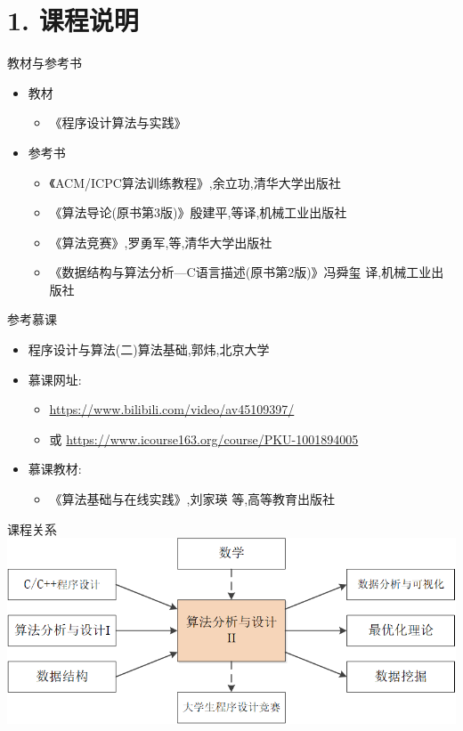 


\frame{\titlepage}
\section{1. 课程说明}
\begin{frame}{教材与参考书}
    \begin{itemize}
        \item 教材
        \begin{itemize}
            \item《程序设计算法与实践》
        \end{itemize}
        \vfill
        \item 参考书
        \begin{itemize}
            \item 《ACM/ICPC算法训练教程》,余立功,清华大学出版社
            \item 《算法导论(原书第3版)》殷建平,等译,机械工业出版社
            \item 《算法竞赛》,罗勇军,等,清华大学出版社
            \item 《数据结构与算法分析—C语言描述(原书第2版)》冯舜玺 译,机械工业出版社
        \end{itemize}
    \end{itemize}
\end{frame}
\begin{frame}{参考慕课}
    \begin{itemize}
        \item 程序设计与算法(二)算法基础,郭炜,北京大学
        \vfill
        \item 慕课网址:
        \begin{itemize}
            \item \url{https://www.bilibili.com/video/av45109397/}
            \item 或 \url{https://www.icourse163.org/course/PKU-1001894005}
        \end{itemize}
        \vfill
        \item 慕课教材:
        \begin{itemize}
            \item 《算法基础与在线实践》,刘家瑛 等,高等教育出版社
        \end{itemize}
    \end{itemize}
\end{frame}
\begin{frame}{课程关系}
    \includegraphics[width=\textwidth]{fig/1-1.png}
\end{frame}
